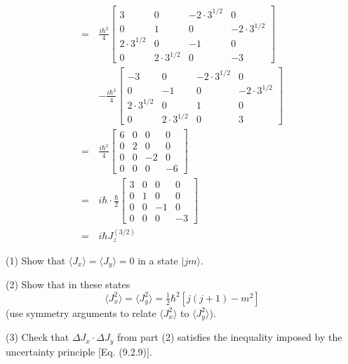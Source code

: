 \documentclass[../principles-of-quantum-mechanics.tex]{subfiles}
\begin{document}
\begin{questions}
\begin{solution}
\begin{align*}
				=\,&\frac{i\hbar^2}{4}\begin{bmatrix}3 & 0 & -2\cdot3^{1/2} & 0 \\ 0 & 1 & 0 & -2\cdot 3^{1/2} \\ 2\cdot3^{1/2} & 0 & -1 & 0 \\ 0 & 2\cdot3^{1/2} & 0 & -3\end{bmatrix} \\
				&-\frac{i\hbar^2}{4}\begin{bmatrix}-3 & 0 & -2\cdot3^{1/2} & 0 \\ 0 & -1 & 0 & -2\cdot 3^{1/2} \\ 2\cdot3^{1/2} & 0 & 1 & 0 \\ 0 & 2\cdot3^{1/2} & 0 & 3\end{bmatrix} \\
				=\,&\frac{i\hbar^2}{4}\begin{bmatrix}6 & 0 & 0 & 0 \\ 0 & 2 & 0 & 0 \\ 0 & 0 & -2 & 0 \\ 0 & 0 & 0 & -6\end{bmatrix} \\
				=\,&i\hbar\cdot\frac{\hbar}{2}\begin{bmatrix}3 & 0 & 0 & 0 \\ 0 & 1 & 0 & 0 \\ 0 & 0 & -1 & 0 \\ 0 & 0 & 0 & -3\end{bmatrix} \\
				=\,&i\hbar J_z^{(3/2)}
			\end{align*}
		\end{solution}
		
		\question (1) Show that $\langle J_x\rangle = \langle J_y\rangle = 0$ in a state $|jm\rangle$.
		
		(2) Show that in these states
		$$\langle J_x^2\rangle = \langle J_y^2\rangle = \tfrac{1}{2}\hbar^2[j(j+1)-m^2]$$
		(use symmetry arguments to relate $\langle J_x^2\rangle$ to $\langle J_y^2\rangle$).
		
		(3) Check that $\Delta J_x \cdot \Delta J_y$ from part (2) satisfies the inequality imposed by the uncertainty principle [Eq. (9.2.9)].
		

\end{questions}
\end{document}
